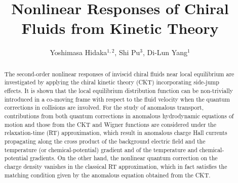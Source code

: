 \documentclass[aps,prd,showkeys,preprint,amsmath,amssymb,nofootinbib]{revtex4-1}
\begin{document}
\fontsize{12pt}{12pt}\selectfont
\title{Nonlinear Responses of Chiral Fluids from Kinetic Theory}

\author{Yoshimasa Hidaka$^{1,2}$, Shi Pu$^{3}$, Di-Lun Yang$^{1}$}
\begin{abstract}
	The second-order nonlinear responses of inviscid chiral fluids near local equilibrium are investigated by applying the chiral kinetic theory (CKT) incorporating side-jump effects.  It is shown that the local equilibrium distribution function can be non-trivially introduced in a co-moving frame with respect to the fluid velocity when the quantum corrections in collisions are involved.
For the study of anomalous transport, 
	contributions from both quantum corrections in anomalous hydrodynamic equations of motion and those from the CKT and Wigner functions are considered under the relaxation-time (RT) approximation, which result in anomalous charge Hall currents propagating along the cross product of the background electric field and the temperature (or chemical-potential) gradient and of the temperature and chemical-potential gradients. On the other hand, the nonlinear quantum correction on the charge density vanishes in the classical RT approximation, which in fact satisfies the matching condition given by the anomalous equation obtained from the CKT.        
\end{abstract}

\maketitle
\end{document}
